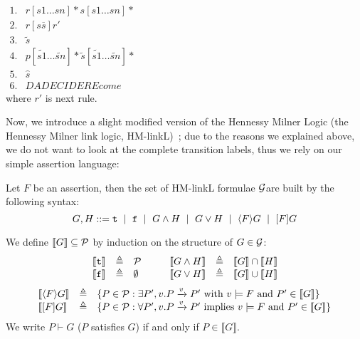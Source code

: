 $
\begin{array}{cl}
1. & r[  s1 \dots sn ] *s[  s1 \dots sn ]* \\
2. & r [ s \overline{s}]  r' \\
3. & \tilde{s}\\
4. & p[  \tilde{s1} \dots \tilde{sn} ] *\tilde{s}[  \tilde{s1} \dots \tilde{sn} ]* \\
5. & \hat{s}\\
6. &DA DECIDERE come
\end{array}
$\\
 where $r'$ is next rule.

Now, we introduce a slight modified version of the Hennessy Milner Logic (the Hennessy Milner link logic, HM-linkL)~\cite{}; due to the reasons we explained above, we do not want to look at the complete transition labels, thus we rely on our simple assertion language:
\begin{definition}[HM-linkL]
Let   $F$ be an assertion, then 
the set of  HM-linkL formulae ${\cal G}$are built by the following syntax:\\
$$
G,H ::= {\tt t} ~\mid~ {\tt f} ~\mid~ G\wedge H ~\mid~ G \vee H ~\mid~ \langle F \rangle G ~\mid~ [F]G
$$
\end{definition}


\begin{definition}[semantics of $G$]
 We define $\llbracket G\rrbracket \subseteq {\cal P}$ by induction on the structure of $G \in {\cal G}$:%
\[
\begin{array}{ccl@{\hspace{1cm}}ccl}
 \llbracket {\tt t}\rrbracket &\defeq& {\cal P} &  \llbracket G\wedge H\rrbracket &\defeq&  \llbracket G\rrbracket  \cap \llbracket H\rrbracket  \\
\llbracket {\tt f}\rrbracket& \defeq& \emptyset &
  \llbracket G\vee H\rrbracket &\defeq&  \llbracket G\rrbracket  \cup \llbracket H\rrbracket \\
\end{array}
\]
\[
\begin{array}{lcl}
 \llbracket  \langle F \rangle G \rrbracket &\triangleq& \{P \in {\cal P}: \exists P', v.P\xrightarrow{v}P' \mbox{ with } v \models F \mbox{ and } P' \in  \llbracket  G \rrbracket\} \\
 \llbracket [F]G \rrbracket &\triangleq& \{P \in {\cal P}: \forall P',v.P\xrightarrow{v}P' \mbox{ implies } v \models F \mbox{ and } P' \in  \llbracket  G \rrbracket\}
\end{array}
\]
We write $P \vdash G$ ($P$ satisfies $G$) if and only if $P \in  \llbracket G \rrbracket$.
\end{definition}

